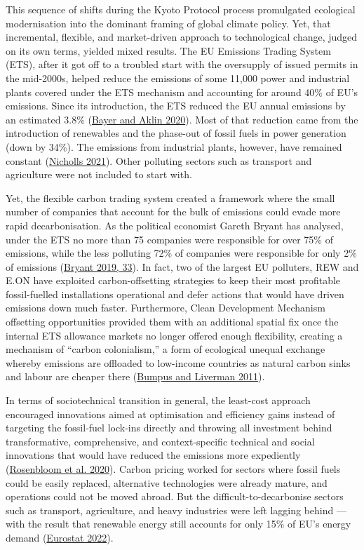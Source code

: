 \documentclass[a4paper, nobind]{templates/ociamthesis}
\begin{document}
This sequence of shifts during the Kyoto Protocol process promulgated ecological modernisation into the dominant framing of global climate policy. Yet, that incremental, flexible, and market-driven approach to technological change, judged on its own terms, yielded mixed results. The EU Emissions Trading System (ETS), after it got off to a troubled start with the oversupply of issued permits in the mid-2000s, helped reduce the emissions of some 11,000 power and industrial plants covered under the ETS mechanism and accounting for around 40\% of EU's emissions. Since its introduction, the ETS reduced the EU annual emissions by an estimated 3.8\% (\protect\hyperlink{ref-bayer_european_2020}{Bayer and Aklin 2020}). Most of that reduction came from the introduction of renewables and the phase-out of fossil fuels in power generation (down by 34\%). The emissions from industrial plants, however, have remained constant (\protect\hyperlink{ref-nicholls_how_2021}{Nicholls 2021}). Other polluting sectors such as transport and agriculture were not included to start with.

Yet, the flexible carbon trading system created a framework where the small number of companies that account for the bulk of emissions could evade more rapid decarbonisation. As the political economist Gareth Bryant has analysed, under the ETS no more than 75 companies were responsible for over 75\% of emissions, while the less polluting 72\% of companies were responsible for only 2\% of emissions (\protect\hyperlink{ref-bryant_carbon_2019}{Bryant 2019, 33}). In fact, two of the largest EU polluters, REW and E.ON have exploited carbon-offsetting strategies to keep their most profitable fossil-fuelled installations operational and defer actions that would have driven emissions down much faster. Furthermore, Clean Development Mechanism offsetting opportunities provided them with an additional spatial fix once the internal ETS allowance markets no longer offered enough flexibility, creating a mechanism of ``carbon colonialism,'' a form of ecological unequal exchange whereby emissions are offloaded to low-income countries as natural carbon sinks and labour are cheaper there (\protect\hyperlink{ref-bumpus_carbon_2011}{Bumpus and Liverman 2011}).

In terms of sociotechnical transition in general, the least-cost approach encouraged innovations aimed at optimisation and efficiency gains instead of targeting the fossil-fuel lock-ins directly and throwing all investment behind transformative, comprehensive, and context-specific technical and social innovations that would have reduced the emissions more expediently (\protect\hyperlink{ref-rosenbloom_opinion_2020}{Rosenbloom et al. 2020}). Carbon pricing worked for sectors where fossil fuels could be easily replaced, alternative technologies were already mature, and operations could not be moved abroad. But the difficult-to-decarbonise sectors such as transport, agriculture, and heavy industries were left lagging behind --- with the result that renewable energy still accounts for only 15\% of EU's energy demand (\protect\hyperlink{ref-eurostat_shedding_2022}{Eurostat 2022}).
\end{document}
